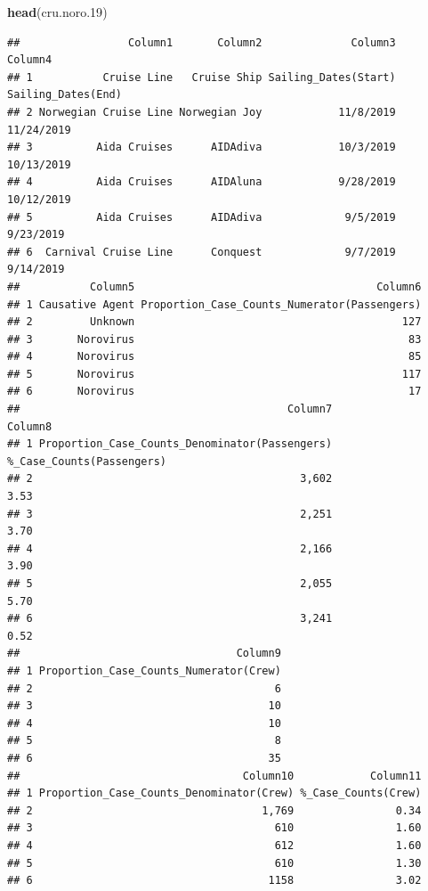 \documentclass[
  11,
]{book}
\newenvironment{Shaded}{\begin{snugshade}}{\end{snugshade}}
\newcommand{\FloatTok}[1]{\textcolor[rgb]{0.06,0.06,0.06}{#1}}
\newcommand{\FunctionTok}[1]{\textcolor[rgb]{0.27,0.27,0.27}{\textbf{#1}}}
\newcommand{\NormalTok}[1]{#1}
\begin{document}
\begin{Shaded}
\begin{Highlighting}[]
\FunctionTok{head}\NormalTok{(cru.noro}\FloatTok{.19}\NormalTok{)}
\end{Highlighting}
\end{Shaded}

\begin{verbatim}
##                 Column1       Column2              Column3            Column4
## 1           Cruise Line   Cruise Ship Sailing_Dates(Start) Sailing_Dates(End)
## 2 Norwegian Cruise Line Norwegian Joy            11/8/2019         11/24/2019
## 3          Aida Cruises      AIDAdiva            10/3/2019         10/13/2019
## 4          Aida Cruises      AIDAluna            9/28/2019         10/12/2019
## 5          Aida Cruises      AIDAdiva             9/5/2019          9/23/2019
## 6  Carnival Cruise Line      Conquest             9/7/2019          9/14/2019
##           Column5                                      Column6
## 1 Causative Agent Proportion_Case_Counts_Numerator(Passengers)
## 2         Unknown                                          127
## 3       Norovirus                                           83
## 4       Norovirus                                           85
## 5       Norovirus                                          117
## 6       Norovirus                                           17
##                                          Column7                   Column8
## 1 Proportion_Case_Counts_Denominator(Passengers) %_Case_Counts(Passengers)
## 2                                          3,602                      3.53
## 3                                          2,251                      3.70
## 4                                          2,166                      3.90
## 5                                          2,055                      5.70
## 6                                          3,241                      0.52
##                                  Column9
## 1 Proportion_Case_Counts_Numerator(Crew)
## 2                                      6
## 3                                     10
## 4                                     10
## 5                                      8
## 6                                     35
##                                   Column10            Column11
## 1 Proportion_Case_Counts_Denominator(Crew) %_Case_Counts(Crew)
## 2                                    1,769                0.34
## 3                                      610                1.60
## 4                                      612                1.60
## 5                                      610                1.30
## 6                                     1158                3.02
\end{verbatim}
\end{document}
